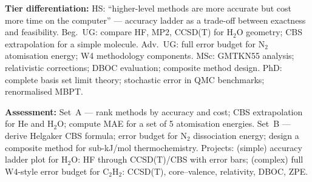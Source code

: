 \documentclass[11pt,a4paper]{article}
\begin{document}
\begin{tcolorbox}[modulebox, title={Module~II.1 / L11: Benchmark Systems and Accuracy Hierarchies}]
\medskip\textbf{Tier differentiation:}
HS: ``higher-level methods are more accurate but cost more time on the computer'' ---
accuracy ladder as a trade-off between exactness and feasibility.
Beg.\ UG: compare HF, MP2, CCSD(T) for H$_2$O geometry; CBS extrapolation for a simple molecule.
Adv.\ UG: full error budget for N$_2$ atomisation energy; W4 methodology components.
MSc: GMTKN55 analysis; relativistic corrections; DBOC evaluation; composite method design.
PhD: complete basis set limit theory; stochastic error in QMC benchmarks; renormalised MBPT.

\medskip\textbf{Assessment:}
Set~A --- rank methods by accuracy and cost; CBS extrapolation for He and H$_2$O;
compute MAE for a set of 5 atomisation energies.
Set~B --- derive Helgaker CBS formula; error budget for N$_2$ dissociation energy;
design a composite method for sub-kJ/mol thermochemistry.
Projects: (simple) accuracy ladder plot for H$_2$O: HF through CCSD(T)/CBS with error bars;
(complex) full W4-style error budget for C$_2$H$_2$: CCSD(T), core--valence, relativity, DBOC, ZPE.
\end{tcolorbox}

\medskip
\end{document}
